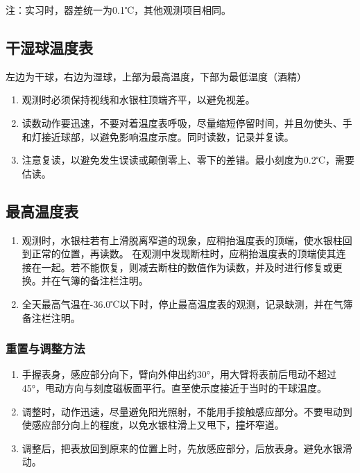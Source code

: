 ﻿\documentclass[UTF8,11pt]{ctexbook}%
\begin{document}
注：实习时，器差统一为0.1℃，其他观测项目相同。

\subsection{干湿球温度表}

左边为干球，右边为湿球，上部为最高温度，下部为最低温度（酒精）

\begin{enumerate}
	\item 观测时必须保持视线和水银柱顶端齐平，以避免视差。
	\item 读数动作要迅速，不要对着温度表呼吸，尽量缩短停留时间，并且勿使头、手和灯接近球部，以避免影响温度示度。同时读数，记录并复读。
	\item 注意复读，以避免发生误读或颠倒零上、零下的差错。最小刻度为0.2℃，需要估读。
\end{enumerate}

\subsection{最高温度表}

\begin{enumerate}
	\item 观测时，水银柱若有上滑脱离窄道的现象，应稍抬温度表的顶端，使水银柱回到正常的位置，再读数。 在观测中发现断柱时，应稍抬温度表的顶端使其连接在一起。若不能恢复，则减去断柱的数值作为读数，并及时进行修复或更换。并在气簿的备注栏注明。
	\item 全天最高气温在-36.0℃以下时，停止最高温度表的观测，记录缺测，并在气簿备注栏注明。
\end{enumerate}

\subsubsection{重置与调整方法}

\begin{enumerate}
	\item 手握表身，感应部分向下，臂向外伸出约30°，用大臂将表前后甩动不超过45°，甩动方向与刻度磁板面平行。直至使示度接近于当时的干球温度。
	\item 调整时，动作迅速，尽量避免阳光照射，不能用手接触感应部分。不要甩动到使感应部分向上的程度，以免水银柱滑上又甩下，撞坏窄道。
	\item 调整后，把表放回到原来的位置上时，先放感应部分，后放表身。避免水银滑动。
\end{enumerate}
\end{document}
